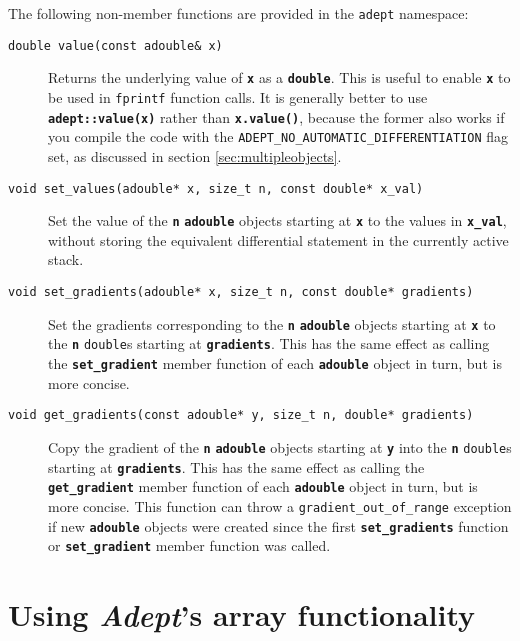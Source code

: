 \documentclass[a4,oneside]{book}
\def\codesize{\small}
\def\Adept{\emph{Adept}}
\def\code#1{{\codesize\texttt{#1}}}
\def\codebf#1{{\codesize\texttt{\textbf{#1}}}}
\def\citem#1{\item[{\codesize\texttt{#1}}]}
\def\Offset{size\_t}
\begin{document}
\noindent The following non-member functions are provided in the
\code{adept} namespace:
\begin{description}
\citem{double value(const adouble\& x)} Returns the underlying
value of \codebf{x} as a \codebf{double}. This is useful to enable
\codebf{x} to be used in \code{fprintf} function calls. It is
generally better to use \codebf{adept::value(x)} rather than
\codebf{x.value()}, because the former also works if you compile the
code with the \code{ADEPT\_NO\_AUTOMATIC\_DIFFERENTIATION} flag set,
as discussed in section \ref{sec:multipleobjects}.
%
\citem{void set\_values(adouble* x, \Offset\ n, const double* x\_val)}
Set the value of the \codebf{n} \codebf{adouble} objects starting at
\codebf{x} to the values in \codebf{x\_val}, without storing the
equivalent differential statement in the currently active stack.
%
\citem{void set\_gradients(adouble* x, size\_t n, const double*
  gradients)} Set the gradients corresponding to the \codebf{n}
\codebf{adouble} objects starting at \codebf{x} to the \codebf{n}
\code{double}s starting at \codebf{gradients}.  This has the same
effect as calling the \codebf{set\_gradient} member function of each
\codebf{adouble} object in turn, but is more concise.
%
\citem{void get\_gradients(const adouble* y, size\_t n, double*
  gradients)} Copy the gradient of the \codebf{n} \codebf{adouble}
objects starting at \codebf{y} into the \codebf{n} \code{double}s
starting at \codebf{gradients}. This has the same effect as calling
the \codebf{get\_gradient} member function of each \codebf{adouble} object
in turn, but is more concise.  This function can throw a
\code{gradient\_out\_of\_range} exception if new \codebf{adouble}
objects were created since the first \codebf{set\_gradients} function
or \codebf{set\_gradient} member function was called.
\end{description}

\chapter{Using \Adept's array functionality}
\label{chap:arrays}
\end{document}
